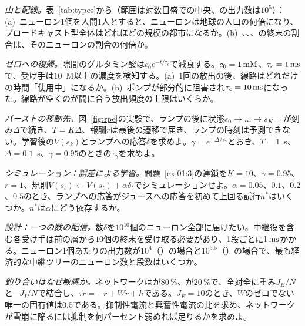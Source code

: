 \begin{exercise}[\lvlA]
\label{ex:01:1}
\emph{山と配線。}表~\ref{tab:types}から（範囲は対数目盛での中央、の出力数は$10^5$）：(a)~ニューロン1個を人間1人とすると、ニューロンは地球の人口の何倍になり、ブロードキャスト型全体はどれほどの規模の都市になるか。(b)~、、、の終末の割合は、そのニューロンの割合の何倍か。
\end{exercise}

\begin{exercise}[\lvlA]
\label{ex:01:2}
\emph{ゼロへの復帰。}隙間のグルタミン酸は$c_0e^{-t/\tau_c}$で減衰する。$c_0=1\,\text{mM}$、$\tau_c=1\,\text{ms}$で、受け手は$10$~\textmu M以上の濃度を検知する。(a)~1回の放出の後、線路はどれだけの時間「使用中」になるか。(b)~ポンプが部分的に阻害され$\tau_c=10\,\text{ms}$になった。線路が空くのが間に合う放出頻度の上限はいくらか。
\end{exercise}

\begin{exercise}[\lvlB]
\label{ex:01:3}
\emph{バーストの移動先。}図~\ref{fig:rpe}の実験で、ランプの後に状態$s_0\to\dots\to s_{K-1}$が刻み$\Delta$で続き、$T=K\Delta$、報酬$r$は最後の遷移で届き、ランプの時刻は予測できない。学習後の$V(s_k)$とランプへの応答$\delta$を求めよ。$\gamma=e^{-\Delta/\tau_\gamma}$とおき、$T=1$~s、$\Delta=0.1$~s、$\gamma=0.95$のときの$\tau_\gamma$を求めよ。
\end{exercise}

\begin{exercise}[\lvlB]
\label{ex:01:4}
\emph{シミュレーション：誤差による学習。}問題~\ref{ex:01:3}の連鎖を$K=10$、$\gamma=0.95$、$r=1$、規則$V(s_t)\leftarrow V(s_t)+\alpha\delta_t$でシミュレーションせよ。$\alpha=0.05$、$0.1$、$0.2$、$0.5$のとき、ランプへの応答がジュースへの応答を初めて上回る試行$n^*$はいくつか。$n^*$は$\alpha$にどう依存するか。
\end{exercise}

\begin{exercise}[\lvlB]
\label{ex:01:5}
\emph{設計：一つの数の配信。}数$\delta$を$10^{10}$個のニューロン全部に届けたい。中継役を含む各受け手は前の層から$10$個の終末を受け取る必要があり、1段ごとに$1\,\text{ms}$かかる。ニューロン1個あたりの出力数が$10^4$（）の場合と$10^{5.5}$（）の場合で、最も経済的な中継ツリーのニューロン数と段数はいくつか。
\end{exercise}

\begin{exercise}[\lvlB]
\label{ex:01:6}
\emph{釣り合いはなぜ敏感か。}ネットワークはが$80\,\%$、が$20\,\%$で、全対全に重み$J_E/N$と$-J_I/N$で結合し、$\tau\dot r=-r+Wr+h$である。$J_E=10$のとき、$W$のゼロでない唯一の固有値は$0.5$である。抑制性電流と興奮性電流の比を求め、ネットワークが雪崩に陥るには抑制を何パーセント弱めれば足りるかを求めよ。
\end{exercise}

